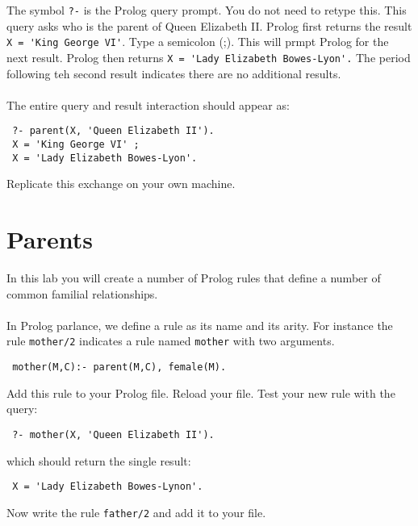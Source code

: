 \documentclass{article}
\begin{document}
\noindent The symbol \verb|?-| is the Prolog query prompt. You do not need to retype this. This query asks who is the parent of Queen Elizabeth II. Prolog first returns the result \verb|X = 'King George VI'|. Type a semicolon (;). This will prmpt Prolog for the next result. Prolog then returns \verb|X = 'Lady Elizabeth Bowes-Lyon'.| The period following teh second result indicates there are no additional results.
\\\\
\noindent The entire query and result interaction should appear as:
\begin{lstlisting}
 ?- parent(X, 'Queen Elizabeth II').
 X = 'King George VI' ;
 X = 'Lady Elizabeth Bowes-Lyon'.
\end{lstlisting}
Replicate this exchange on your own machine.

\section*{Parents}
In this lab you will create a number of Prolog rules that define a number of common familial relationships.
\\\\
\noindent In Prolog parlance, we define a rule as its name and its arity. For instance the rule \verb|mother/2| indicates a rule named \verb|mother| with two arguments.
\begin{lstlisting}
 mother(M,C):- parent(M,C), female(M).
\end{lstlisting}
\noindent Add this rule to your Prolog file. Reload your file. Test your new rule with the query:
\begin{lstlisting}
 ?- mother(X, 'Queen Elizabeth II').
\end{lstlisting}
\noindent which should return the single result:
\begin{lstlisting}
 X = 'Lady Elizabeth Bowes-Lynon'.
\end{lstlisting}
\noindent Now write the rule \verb|father/2| and add it to your file.
\end{document}
